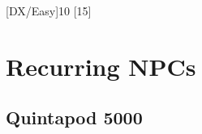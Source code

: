 \begin{character}
  [DX/Easy]{10}
  [15]
\end{character}


\chapter{Recurring NPCs}
\label{cha:recurring-npcs}

\section{Quintapod 5000}
\label{sec:quintapod-5000}






